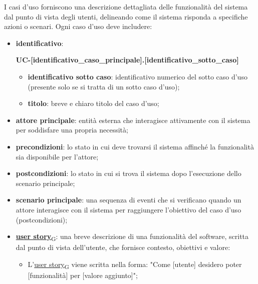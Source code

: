 I casi d'uso forniscono una descrizione dettagliata delle funzionalità del sistema dal punto di vista degli utenti, delineando come il sistema risponda a specifiche azioni o scenari. Ogni caso d'uso deve includere:
\begin{itemize}
	\item \textbf{identificativo}:
	      \begin{center}
		      \textbf{UC-[identificativo\_caso\_principale].[identificativo\_sotto\_caso]}
	      \end{center}
	      \begin{itemize}
		      \item \textbf{identificativo sotto caso}: identificativo numerico del sotto caso d'uso (presente solo se si tratta di un sotto caso d'uso);
		      \item \textbf{titolo}: breve e chiaro titolo del caso d'uso;
	      \end{itemize}
	\item \textbf{attore principale}: entità esterna che interagisce attivamente con il sistema per soddisfare una propria necessità;
	\item \textbf{precondizioni}: lo stato in cui deve trovarsi il sistema affinché la funzionalità sia disponibile per l'attore;
	\item \textbf{postcondizioni}: lo stato in cui si trova il sistema dopo l'esecuzione dello scenario principale;
	\item \textbf{scenario principale}: una sequenza di eventi che si verificano quando un attore interagisce con il sistema per raggiungere l'obiettivo del caso d'uso (postcondizioni);
	\item \href{https://7last.github.io/docs/rtb/documentazione-interna/glossario\#user-story}{\textbf{user story}\textsubscript{G}}: una breve descrizione di una funzionalità del software, scritta dal punto di vista dell'utente, che fornisce contesto, obiettivi e valore:
	      \begin{itemize}
		      \item L'\href{https://7last.github.io/docs/rtb/documentazione-interna/glossario\#user-story}{user story\textsubscript{G}} viene scritta nella forma: "Come [utente] desidero poter [funzionalità] per [valore aggiunto]";
	      \end{itemize}
\end{itemize}

